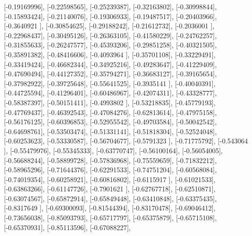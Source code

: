 \documentclass{article}
\begin{document}
       [-0.19169996],
       [-0.22598565],
       [-0.25239387],
       [-0.32163802],
       [-0.30998844],
       [-0.15893424],
       [-0.21140076],
       [-0.19306933],
       [-0.19487517],
       [-0.20403966],
       [-0.3640921 ],
       [-0.30854625],
       [-0.29188242],
       [-0.21612732],
       [-0.2036001 ],
       [-0.22968437],
       [-0.30495126],
       [-0.26363105],
       [-0.41580229],
       [-0.24762257],
       [-0.31855633],
       [-0.26247577],
       [-0.45393206],
       [-0.29851258],
       [-0.40321505],
       [-0.35891382],
       [-0.48416606],
       [-0.4093964 ],
       [-0.35701108],
       [-0.33229491],
       [-0.33419424],
       [-0.46682344],
       [-0.34925216],
       [-0.49283647],
       [-0.41229409],
       [-0.47690494],
       [-0.44127352],
       [-0.35794271],
       [-0.36683127],
       [-0.39165654],
       [-0.37982922],
       [-0.39725648],
       [-0.55641525],
       [-0.3935141 ],
       [-0.40040391],
       [-0.44725594],
       [-0.41296401],
       [-0.60486967],
       [-0.42074311],
       [-0.43328777],
       [-0.58387397],
       [-0.50151411],
       [-0.4993802 ],
       [-0.53218835],
       [-0.45779193],
       [-0.47769437],
       [-0.46392543],
       [-0.47084276],
       [-0.62813614],
       [-0.47975158],
       [-0.56176125],
       [-0.60396853],
       [-0.52955542],
       [-0.49703584],
       [-0.50042542],
       [-0.64698761],
       [-0.53503474],
       [-0.51331141],
       [-0.51818304],
       [-0.52524048],
       [-0.60253623],
       [-0.53330587],
       [-0.56704677],
       [-0.5791323 ],
       [-0.71775792],
       [-0.543064  ],
       [-0.55479976],
       [-0.55345333],
       [-0.63770747],
       [-0.56100164],
       [-0.56054005],
       [-0.56688244],
       [-0.58899728],
       [-0.57836968],
       [-0.75559659],
       [-0.71832212],
       [-0.58965296],
       [-0.71644376],
       [-0.62291533],
       [-0.74751204],
       [-0.60568084],
       [-0.74019354],
       [-0.60258921],
       [-0.60816802],
       [-0.6115917 ],
       [-0.61021533],
       [-0.63863266],
       [-0.61147726],
       [-0.7901621 ],
       [-0.62767718],
       [-0.62510871],
       [-0.63074567],
       [-0.65872914],
       [-0.65849448],
       [-0.63410848],
       [-0.63375435],
       [-0.8317649 ],
       [-0.69300093],
       [-0.81544394],
       [-0.83170478],
       [-0.69046412],
       [-0.73656038],
       [-0.85093793],
       [-0.65717797],
       [-0.65375879],
       [-0.65715108],
       [-0.65370931],
       [-0.85113596],
       [-0.67088227],
\end{document}
